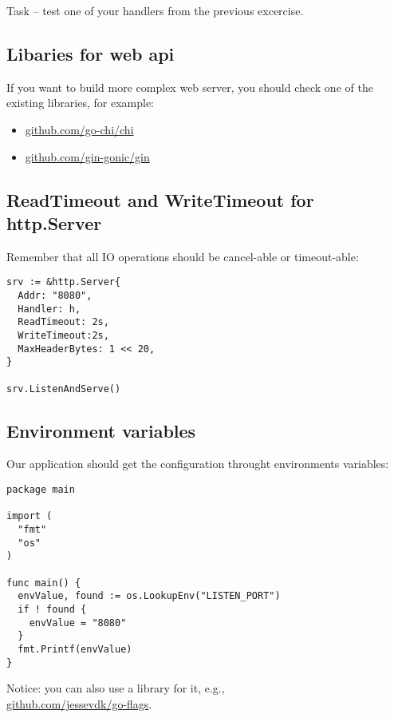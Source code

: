 \documentclass[11pt, letterpaper]{article}
\begin{document}
\bigskip
Task -- test one of your handlers from the previous excercise.

\subsection{Libaries for web api}

If you want to build more complex web server, you should check one of the existing libraries, for example: \begin{itemize}
\item \href{https://github.com/go-chi/chi}{github.com/go-chi/chi}
\item \href{https://github.com/gin-gonic/gin}{github.com/gin-gonic/gin}
\end{itemize}

\subsection{ReadTimeout and WriteTimeout for http.Server}
Remember that all {\small IO} operations should be cancel-able or timeout-able:

\begin{verbatim}
srv := &http.Server{
  Addr: "8080",
  Handler: h,
  ReadTimeout: 2s,
  WriteTimeout:2s,
  MaxHeaderBytes: 1 << 20,
}

srv.ListenAndServe()
\end{verbatim}

\subsection{Environment variables}

Our application should get the configuration throught environments variables:

\begin{verbatim}
package main

import (
  "fmt"
  "os"
)

func main() {
  envValue, found := os.LookupEnv("LISTEN_PORT")
  if ! found {
    envValue = "8080"
  }
  fmt.Printf(envValue)
}
\end{verbatim}
\bigskip
Notice: you can also use a library for it, e.g.,\\ \href{https://github.com/jessevdk/go-flags}{github.com/jessevdk/go-flags}.

\end{document}
